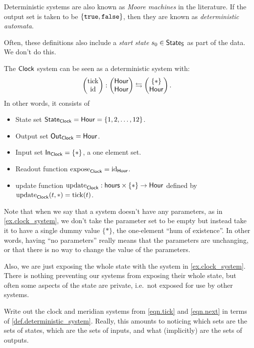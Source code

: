 \documentclass[DynamicalBook]{subfiles}
\begin{document}
\begin{remark}
  Deterministic systems are also known as \emph{Moore machines} in the
  literature. If the output set is taken to be $\{\mathtt{true},
  \mathtt{false}\}$, then they are known as \emph{deterministic automata}.

  Often, these definitions also include a \emph{start state} $s_0 \in \mathsf{State}_{\mathsf{S}}$
  as part of the data. We don't do this.
\end{remark}

\begin{example}\label{ex.clock_system}
  The $\mathsf{Clock}$ system can be seen as a deterministic system with:
  $$\begin{pmatrix}{\mathrm{tick}} \\ {\mathrm{id}} \end{pmatrix} : \begin{pmatrix}{\mathsf{Hour}} \\ {\mathsf{Hour}} \end{pmatrix} \leftrightarrows \begin{pmatrix}{\{\ast\}} \\ {\mathsf{Hour}} \end{pmatrix}.$$
  In other words, it consists of
  \begin{itemize}
  \item State set $\mathsf{State}_{\mathsf{Clock}} = \mathsf{Hour} =\{1,2,\ldots,12\}$.
  \item Output set $\mathsf{Out}_{\mathsf{Clock}} = \mathsf{Hour}$.
  \item Input set $\mathsf{In}_{\mathsf{Clock}} = \{\ast\}$, a one element set.
  \item Readout function $\mathrm{expose}_{\mathsf{Clock}} = \mathrm{id}_{\mathsf{Hour}}$.
  \item update function $\mathrm{update}_{\mathsf{Clock}} : \mathsf{hours} \times \{\ast\} \to \mathsf{Hour}$
    defined by $\mathrm{update}_{\mathsf{Clock}}(t, \ast) = \mathrm{tick}(t)$.
  \end{itemize}
\end{example}

Note that when we say that a system doesn't have any parameters, as in \cref{ex.clock_system}, we don't take the
parameter set to be empty but instead take it to have a single dummy value $\{*\}$, the one-element ``hum of existence''. In other words, having ``no parameters'' really means that the parameters are unchanging, or that there is no way to change the value of the parameters.

Also, we are just exposing the whole state with the system in \cref{ex.clock_system}. There is nothing preventing our systems
from exposing their whole state, but often some aspects of the state are private, i.e.\ not exposed for use by other systems. 

\begin{exercise}\label{exc.clock_meridian_diner}
  Write out the clock and meridian systems from \eqref{eqn.tick} and \eqref{eqn.next} in terms of
  \cref{def.deterministic_system}. Really, this amounts to noticing which sets
  are the sets of states, which are the sets of inputs, and what (implicitly)
  are the sets of outputs.
\end{exercise}
\end{document}

